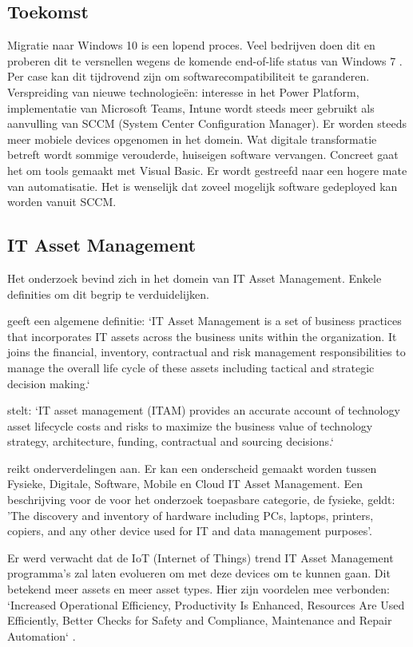\subsection{Toekomst}

Migratie naar Windows 10 is een lopend proces. Veel bedrijven doen dit en proberen dit te versnellen wegens de komende end-of-life status van Windows 7 \autocite{MicrosoftSupport2020}. Per case kan dit tijdrovend zijn om softwarecompatibiliteit te garanderen.
Verspreiding van nieuwe technologieën: interesse in het Power Platform, implementatie van Microsoft Teams, Intune wordt steeds meer gebruikt als aanvulling van SCCM (System Center Configuration Manager). Er worden steeds meer mobiele devices opgenomen in het domein.
Wat digitale transformatie betreft wordt sommige verouderde, huiseigen software vervangen. Concreet gaat het om tools gemaakt met Visual Basic.
Er wordt gestreefd naar een hogere mate van automatisatie. Het is wenselijk dat zoveel mogelijk software gedeployed kan worden vanuit SCCM.

\subsection{IT Asset Management}

Het onderzoek bevind zich in het domein van IT Asset Management. Enkele definities om dit begrip te verduidelijken.

\textcite{IAITAM} geeft een algemene definitie: `IT Asset Management is a set of business practices that incorporates IT assets across the business units within the organization. It joins the financial, inventory, contractual and risk management responsibilities to manage the overall life cycle of these assets including tactical and strategic decision making.`

\textcite{Gartner} stelt: `IT asset management (ITAM) provides an accurate account of technology asset lifecycle costs and risks to maximize the business value of technology strategy, architecture, funding, contractual and sourcing decisions.`

\textcite{Ivanti2018} reikt onderverdelingen aan. Er kan een onderscheid gemaakt worden tussen Fysieke, Digitale, Software, Mobile en Cloud IT Asset Management.
Een beschrijving voor de voor het onderzoek toepasbare categorie, de fysieke, geldt: 'The discovery and inventory of hardware including PCs, laptops, printers, copiers, and any other device used for IT and data management purposes'.

Er werd verwacht dat de IoT (Internet of Things) trend IT Asset Management programma's zal laten evolueren om met deze devices om te kunnen gaan. Dit betekend meer assets en meer asset types. Hier zijn voordelen mee verbonden: `Increased Operational Efficiency, Productivity Is Enhanced, Resources Are Used Efficiently, Better Checks for Safety and Compliance, Maintenance and Repair Automation` \autocite{Badnakhe2020}.

